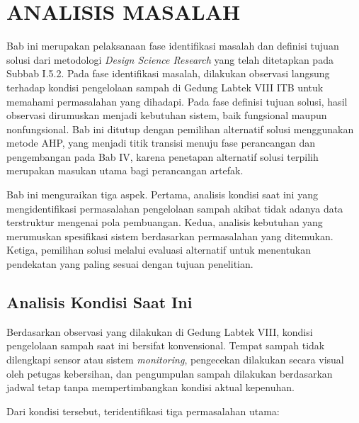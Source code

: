 \cleardoublepage
\chapter{ANALISIS MASALAH}
\label{chap:analisis-masalah}

Bab ini merupakan pelaksanaan fase identifikasi masalah dan definisi tujuan solusi dari metodologi \textit{Design Science Research} yang telah ditetapkan pada Subbab I.5.2. Pada fase identifikasi masalah, dilakukan observasi langsung terhadap kondisi pengelolaan sampah di Gedung Labtek VIII ITB untuk memahami permasalahan yang dihadapi. Pada fase definisi tujuan solusi, hasil observasi dirumuskan menjadi kebutuhan sistem, baik fungsional maupun nonfungsional. Bab ini ditutup dengan pemilihan alternatif solusi menggunakan metode AHP, yang menjadi titik transisi menuju fase perancangan dan pengembangan pada Bab IV, karena penetapan alternatif solusi terpilih merupakan masukan utama bagi perancangan artefak.

Bab ini menguraikan tiga aspek. Pertama, analisis kondisi saat ini yang mengidentifikasi permasalahan pengelolaan sampah akibat tidak adanya data terstruktur mengenai pola pembuangan. Kedua, analisis kebutuhan yang merumuskan spesifikasi sistem berdasarkan permasalahan yang ditemukan. Ketiga, pemilihan solusi melalui evaluasi alternatif untuk menentukan pendekatan yang paling sesuai dengan tujuan penelitian.

\section{Analisis Kondisi Saat Ini}
\label{sec:analisis-kondisi}

Berdasarkan observasi yang dilakukan di Gedung Labtek VIII, kondisi pengelolaan sampah saat ini bersifat konvensional. Tempat sampah tidak dilengkapi sensor atau sistem \textit{monitoring}, pengecekan dilakukan secara visual oleh petugas kebersihan, dan pengumpulan sampah dilakukan berdasarkan jadwal tetap tanpa mempertimbangkan kondisi aktual kepenuhan.

Dari kondisi tersebut, teridentifikasi tiga permasalahan utama:

